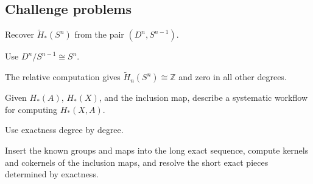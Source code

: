 \subsection*{Challenge problems}

\begin{exercise}\label{exr:viii19-ped-15}
Recover $\widetilde H_*(S^n)$ from the pair $(D^n,S^{n-1})$.
\end{exercise}
\begin{hint}
Use $D^n/S^{n-1}\cong S^n$.
\end{hint}
\begin{solution}
The relative computation gives $\widetilde H_n(S^n)\cong\mathbb Z$ and zero in all other degrees.
\end{solution}

\begin{exercise}\label{exr:viii19-ped-16}
Given $H_*(A)$, $H_*(X)$, and the inclusion map, describe a systematic workflow for computing $H_*(X,A)$.
\end{exercise}
\begin{hint}
Use exactness degree by degree.
\end{hint}
\begin{solution}
Insert the known groups and maps into the long exact sequence, compute kernels and cokernels of the inclusion maps, and resolve the short exact pieces determined by exactness.
\end{solution}

